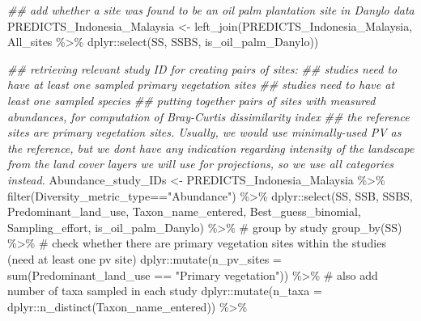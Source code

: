 \documentclass[
  letterpaper,
  DIV=11,
  numbers=noendperiod]{scrartcl}
\newenvironment{Shaded}{\begin{snugshade}}{\end{snugshade}}
\newcommand{\AttributeTok}[1]{\textcolor[rgb]{0.40,0.45,0.13}{#1}}
\newcommand{\CommentTok}[1]{\textcolor[rgb]{0.37,0.37,0.37}{#1}}
\newcommand{\DocumentationTok}[1]{\textcolor[rgb]{0.37,0.37,0.37}{\textit{#1}}}
\newcommand{\FunctionTok}[1]{\textcolor[rgb]{0.28,0.35,0.67}{#1}}
\newcommand{\NormalTok}[1]{\textcolor[rgb]{0.00,0.23,0.31}{#1}}
\newcommand{\OtherTok}[1]{\textcolor[rgb]{0.00,0.23,0.31}{#1}}
\newcommand{\SpecialCharTok}[1]{\textcolor[rgb]{0.37,0.37,0.37}{#1}}
\newcommand{\StringTok}[1]{\textcolor[rgb]{0.13,0.47,0.30}{#1}}
\begin{document}
\begin{Shaded}
\begin{Highlighting}[]
\DocumentationTok{\#\# add whether a site was found to be an oil palm plantation site in Danylo data}
\NormalTok{PREDICTS\_Indonesia\_Malaysia }\OtherTok{\textless{}{-}} \FunctionTok{left\_join}\NormalTok{(PREDICTS\_Indonesia\_Malaysia, }
\NormalTok{                                         All\_sites }\SpecialCharTok{\%\textgreater{}\%} 
\NormalTok{                                           dplyr}\SpecialCharTok{::}\FunctionTok{select}\NormalTok{(SS, SSBS, is\_oil\_palm\_Danylo))}

\DocumentationTok{\#\# retrieving relevant study ID for creating pairs of sites: }
\DocumentationTok{\#\# studies need to have at least one sampled primary vegetation sites}
\DocumentationTok{\#\# studies need to have at least one sampled species}
\DocumentationTok{\#\# putting together pairs of sites with measured abundances, for computation of Bray{-}Curtis dissimilarity index}
\DocumentationTok{\#\# the reference sites are primary vegetation sites. Usually, we would use minimally{-}used PV as the reference, but we don\textquotesingle{}t have any indication regarding intensity of the landscape from the land cover layers we will use for projections, so we use all categories instead.}
\NormalTok{Abundance\_study\_IDs }\OtherTok{\textless{}{-}} 
\NormalTok{  PREDICTS\_Indonesia\_Malaysia }\SpecialCharTok{\%\textgreater{}\%}
  \FunctionTok{filter}\NormalTok{(Diversity\_metric\_type}\SpecialCharTok{==}\StringTok{"Abundance"}\NormalTok{) }\SpecialCharTok{\%\textgreater{}\%}
\NormalTok{  dplyr}\SpecialCharTok{::}\FunctionTok{select}\NormalTok{(SS, SSB, SSBS, Predominant\_land\_use, Taxon\_name\_entered, Best\_guess\_binomial, Sampling\_effort, is\_oil\_palm\_Danylo) }\SpecialCharTok{\%\textgreater{}\%}
  \CommentTok{\# group by study}
  \FunctionTok{group\_by}\NormalTok{(SS) }\SpecialCharTok{\%\textgreater{}\%}
  \CommentTok{\# check whether there are primary vegetation sites within the studies (need at least one pv site)}
\NormalTok{  dplyr}\SpecialCharTok{::}\FunctionTok{mutate}\NormalTok{(}\AttributeTok{n\_pv\_sites =} \FunctionTok{sum}\NormalTok{(Predominant\_land\_use }\SpecialCharTok{==} \StringTok{"Primary vegetation"}\NormalTok{)) }\SpecialCharTok{\%\textgreater{}\%}
  \CommentTok{\# also add number of taxa sampled in each study}
\NormalTok{  dplyr}\SpecialCharTok{::}\FunctionTok{mutate}\NormalTok{(}\AttributeTok{n\_taxa =}\NormalTok{ dplyr}\SpecialCharTok{::}\FunctionTok{n\_distinct}\NormalTok{(Taxon\_name\_entered)) }\SpecialCharTok{\%\textgreater{}\%} 

\end{Highlighting}
\end{Shaded}
\end{document}
